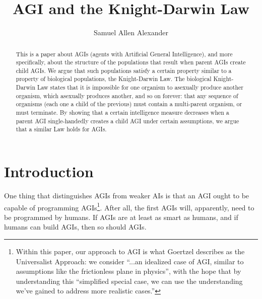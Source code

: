 \documentclass[runningheads]{llncs}
\begin{document}
\title{AGI and the Knight-Darwin Law}

\author{Samuel Allen Alexander}

\maketitle

\begin{abstract}
This is a paper about AGIs (agents with Artificial General Intelligence),
and more specifically, about the structure of the populations that
result when parent AGIs create child AGIs. We argue that such populations
satisfy a certain property similar to a property of biological
populations, the Knight-Darwin Law.
The biological Knight-Darwin Law states that it is impossible for one organism
to asexually produce another organism, which asexually produces another,
and so on forever:
that any sequence of organisms (each one a child of the previous) must contain
a multi-parent organism, or must terminate.
By showing that a certain intelligence measure decreases when a parent AGI
single-handedly creates a child AGI under certain assumptions,
we argue that a similar Law holds for AGIs.


\end{abstract}

\section{Introduction}

One thing that distinguishes AGIs from weaker AIs is that an
AGI ought to be capable of programming AGIs\footnote{Within this paper,
our approach to AGI is what Goertzel \cite{goertzel2014artificial} describes
as the Universalist Approach:
we consider ``...an idealized case of AGI, similar to
assumptions like the frictionless plane in physics'', with the hope that by
understanding this ``simplified special
case, we can use the understanding we've gained to address more realistic
cases.''}. After all, the first AGIs will,
apparently, need to be programmed by humans. If AGIs are at least as smart as
humans, and if humans can
build AGIs, then so should AGIs.
\end{document}
